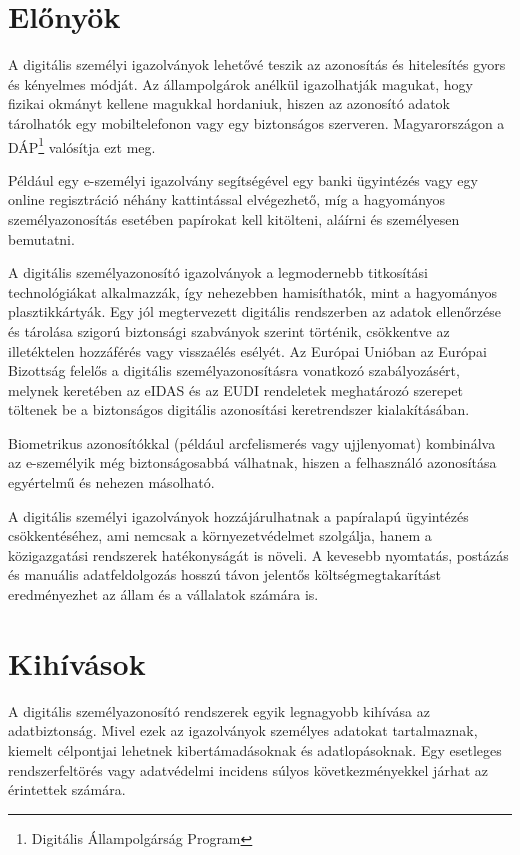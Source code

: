 \documentclass[
]{thesis-ekf}
\theoremstyle{definition}
\theoremstyle{remark}
\begin{document}
	\section{Előnyök}
	
	A digitális személyi igazolványok lehetővé teszik az azonosítás és hitelesítés gyors és kényelmes módját. Az állampolgárok anélkül igazolhatják magukat, hogy fizikai okmányt kellene magukkal hordaniuk, hiszen az azonosító adatok tárolhatók egy mobiltelefonon vagy egy biztonságos szerveren. Magyarországon a DÁP\footnote{Digitális Állampolgárság Program} valósítja ezt meg.
	
	Például egy e-személyi igazolvány segítségével egy banki ügyintézés vagy egy online regisztráció néhány kattintással elvégezhető, míg a hagyományos személyazonosítás esetében papírokat kell kitölteni, aláírni és személyesen bemutatni.

	A digitális személyazonosító igazolványok a legmodernebb titkosítási technológiákat alkalmazzák, így nehezebben hamisíthatók, mint a hagyományos plasztikkártyák. Egy jól megtervezett digitális rendszerben az adatok ellenőrzése és tárolása szigorú biztonsági szabványok szerint történik, csökkentve az illetéktelen hozzáférés vagy visszaélés esélyét. Az Európai Unióban az Európai Bizottság felelős a digitális személyazonosításra vonatkozó szabályozásért, melynek keretében az eIDAS és az EUDI rendeletek meghatározó szerepet töltenek be a biztonságos digitális azonosítási keretrendszer kialakításában. \cite{eIDAS, EUDI}
	
	Biometrikus azonosítókkal (például arcfelismerés vagy ujjlenyomat) kombinálva az e-személyik még biztonságosabbá válhatnak, hiszen a felhasználó azonosítása egyértelmű és nehezen másolható.

	A digitális személyi igazolványok hozzájárulhatnak a papíralapú ügyintézés csökkentéséhez, ami nemcsak a környezetvédelmet szolgálja, hanem a közigazgatási rendszerek hatékonyságát is növeli. A kevesebb nyomtatás, postázás és manuális adatfeldolgozás hosszú távon jelentős költségmegtakarítást eredményezhet az állam és a vállalatok számára is.
	\section{Kihívások}

	A digitális személyazonosító rendszerek egyik legnagyobb kihívása az adatbiztonság. Mivel ezek az igazolványok személyes adatokat tartalmaznak, kiemelt célpontjai lehetnek kibertámadásoknak és adatlopásoknak. Egy esetleges rendszerfeltörés vagy adatvédelmi incidens súlyos következményekkel járhat az érintettek számára.
	
\end{document}
